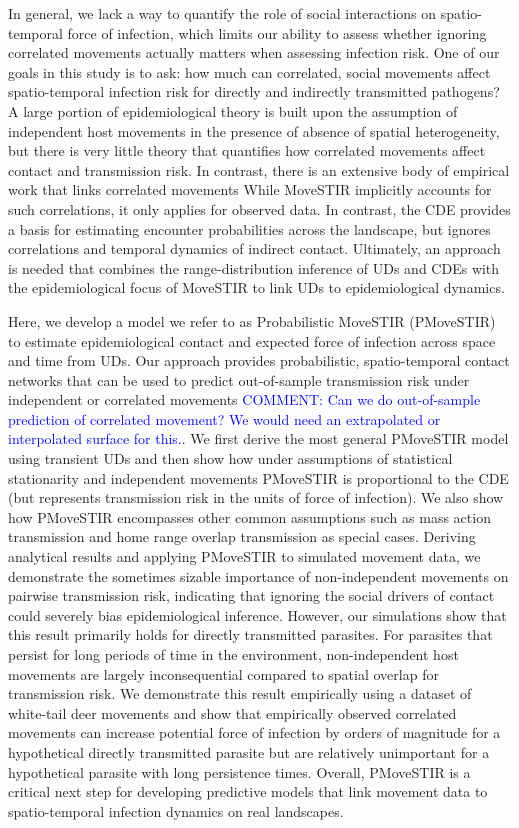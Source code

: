 \documentclass[letterpaper]{article}
\begin{document}
In general, we lack a way to quantify the role of social interactions on spatio-temporal force of infection, which limits our ability to assess whether ignoring correlated movements actually matters when assessing infection risk. One of our goals in this study is to ask: how much can correlated, social movements affect spatio-temporal infection risk for directly and indirectly transmitted pathogens? A large portion of epidemiological theory is built upon the assumption of independent host movements in the presence of absence of spatial heterogeneity, but there is very little theory that quantifies how correlated movements affect contact and transmission risk.  In contrast, there is an extensive body of empirical work that links correlated movements While MoveSTIR implicitly accounts for such correlations, it only applies for observed data. In contrast, the CDE provides a basis for estimating encounter probabilities across the landscape, but ignores correlations and temporal dynamics of indirect contact.
Ultimately, an approach is needed that combines the range-distribution inference of UDs and CDEs \citep{Alston2022,Noonan2021} with the epidemiological focus of MoveSTIR to link UDs to epidemiological dynamics. 

Here, we develop a model we refer to as Probabilistic MoveSTIR (PMoveSTIR) to estimate epidemiological contact and expected force of infection across space and time from UDs. Our approach provides probabilistic, spatio-temporal contact networks that can be used to predict out-of-sample transmission risk under independent or correlated movements \textcolor{blue}{COMMENT: Can we do out-of-sample prediction of correlated movement? We would need an extrapolated or interpolated surface for this.}. We first derive the most general PMoveSTIR model using transient UDs and then show how under assumptions of statistical stationarity and independent movements PMoveSTIR is proportional to the CDE (but represents transmission risk in the units of force of infection). We also show how PMoveSTIR encompasses other common assumptions such as mass action transmission and home range overlap transmission as special cases. Deriving analytical results and applying PMoveSTIR to simulated movement data, we demonstrate the sometimes sizable importance of non-independent movements on pairwise transmission risk, indicating that ignoring the social drivers of contact could severely bias epidemiological inference. However, our simulations show that this result primarily holds for directly transmitted parasites. For parasites that persist for long periods of time in the environment, non-independent host movements are largely inconsequential compared to spatial overlap for transmission risk. We demonstrate this result empirically using a dataset of white-tail deer movements and show that empirically observed correlated movements can increase potential force of infection by orders of magnitude for a hypothetical directly transmitted parasite but are relatively unimportant for a hypothetical parasite with long persistence times.  Overall, PMoveSTIR is a critical next step for developing predictive models that link movement data to spatio-temporal infection dynamics on real landscapes.
\end{document}
